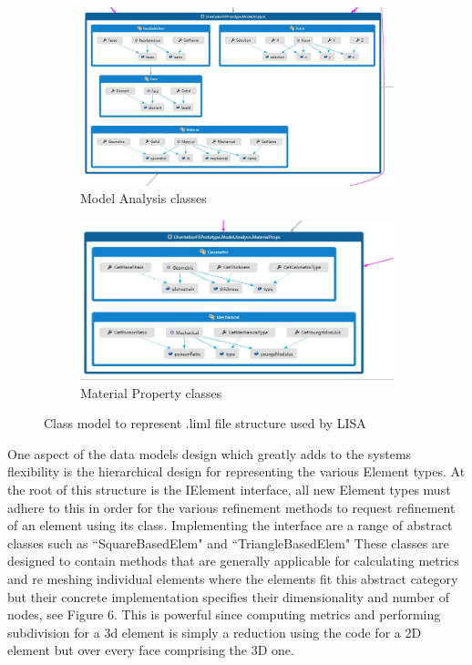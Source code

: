 \begin{figure}
\centering
\begin{subfigure}{.5\textwidth}
  \centering
  \includegraphics[width=0.9\linewidth]{../Graphics/DissoFEProto-ModelAnalysis.jpg}
  \caption{Model Analysis classes}
  \label{fig:sub1}
\end{subfigure}%
\begin{subfigure}{.5\textwidth}
  \centering
  \includegraphics[width=0.9\linewidth]{../Graphics/DissoFEProto-MaterialProps.jpg}
  \caption{Material Property classes}
  \label{fig:sub2}
\end{subfigure}
\label{fig:test}
\caption{Class model to represent .liml file structure used by LISA}
\end{figure}

\noindent
One aspect of the data models design which greatly adds to the systems flexibility is the hierarchical design for representing the various Element types. At the root of this structure is the IElement interface, all new Element types must adhere to this in order for the various refinement methods to request refinement of an element using its class. Implementing the interface are a range of abstract classes such as ``SquareBasedElem" and ``TriangleBasedElem" These classes are designed to contain methods that are generally applicable for calculating metrics and re meshing individual elements where the elements fit this abstract category but their concrete implementation specifies their dimensionality and number of nodes, see Figure 6. This is powerful since computing metrics and performing subdivision for a 3d element is simply a reduction using the code for a 2D element but over every face comprising the 3D one. \\ 

